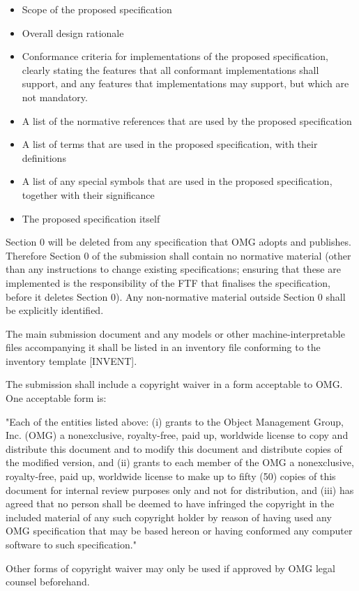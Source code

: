 \begin{itemize}
\item Scope of the proposed specification
\item Overall design rationale
\item Conformance criteria for implementations of the proposed specification, clearly stating the features that all conformant implementations shall support, and any features that implementations may support, but which are not mandatory.
\item A list of the normative references that are used by the proposed specification
\item A list of terms that are used in the proposed specification, with their definitions
\item A list of any special symbols that are used in the proposed specification, together with their significance
\item The proposed specification itself
\end{itemize}
Section 0 will be deleted from any specification that OMG adopts and publishes. Therefore Section 0 of the submission shall contain no normative material (other than any instructions to change existing specifications; ensuring that these are implemented is the responsibility of the FTF that finalises the specification, before it deletes Section 0). Any non-normative material outside Section 0 shall be explicitly identified.

The main submission document and any models or other machine-interpretable files accompanying it shall be listed in an inventory file conforming to the inventory template [INVENT].

The submission shall include a copyright waiver in a form acceptable to OMG. One acceptable form is:
\begin{adjustwidth}{1em}{}"Each of the entities listed above: (i) grants to the Object Management Group, Inc. (OMG) a nonexclusive, royalty-free, paid up, worldwide license to copy and distribute this document and to modify this document and distribute copies of the modified version, and (ii) grants to each member of the OMG a nonexclusive, royalty-free, paid up, worldwide license to make up to fifty (50) copies of this document for internal review purposes only and not for distribution, and (iii) has agreed that no person shall be deemed to have infringed the copyright in the included material of any such copyright holder by reason of having used any OMG specification that may be based hereon or having conformed any computer software to such specification."
\end{adjustwidth}
Other forms of copyright waiver may only be used if approved by OMG legal counsel beforehand.


